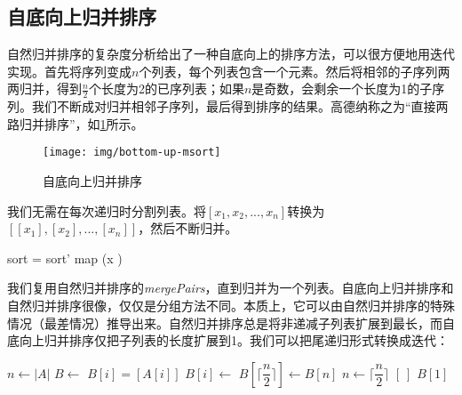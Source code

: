 \documentclass[b5paper]{ctexart}
\begin{document}
\subsection{自底向上归并排序}

自然归并排序的复杂度分析给出了一种自底向上的排序方法，可以很方便地用迭代实现。首先将序列变成$n$个列表，每个列表包含一个元素。然后将相邻的子序列两两归并，得到$\frac{n}{2}$个长度为2的已序列表；如果$n$是奇数，会剩余一个长度为1的子序列。我们不断成对归并相邻子序列，最后得到排序的结果。高德纳称之为“直接两路归并排序”\cite{TAOCP}，如\cref{fig:bottom-up-msort}所示。

\begin{figure}[htbp]
 \centering
 \texttt{[image: img/bottom-up-msort]}
 \caption{自底向上归并排序}
 \label{fig:bottom-up-msort}
\end{figure}

我们无需在每次递归时分割列表。将$[x_1, x_2, ..., x_n]$转换为$[[x_1], [x_2], ..., [x_n]]$，然后不断归并。

\be
sort = sort' \circ map (x \mapsto [x])
\ee

我们复用自然归并排序的\textit{mergePairs}，直到归并为一个\cite{okasaki-book}列表。自底向上归并排序和自然归并排序很像，仅仅是分组方法不同。本质上，它可以由自然归并排序的特殊情况（最差情况）推导出来。自然归并排序总是将非递减子列表扩展到最长，而自底向上归并排序仅把子列表的长度扩展到1。我们可以把尾递归形式转换成迭代：

\begin{algorithmic}[1]
  \State $n \gets |A|$
  \State $B \gets $ 
    \State $B[i] = [A[i]]$
  \EndFor
      \State $B[i] \gets$ 
    \EndFor
      \State $B[\lceil \dfrac{n}{2} \rceil] \gets B[n]$
    \EndIf
    \State $n \gets \lceil \dfrac{n}{2} \rceil$
  \EndWhile
    \State \Return $[\ ]$
  \EndIf
  \State \Return $B[1]$
\EndFunction
\end{algorithmic}

\begin{Exercise}\label{ex:pairwise-fold}
\end{Exercise}
\end{document}

